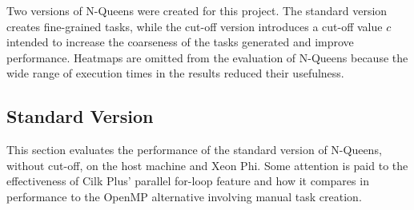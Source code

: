 \documentclass{report}
\begin{document}
Two versions of N-Queens were created for this project. The standard version creates fine-grained tasks, while the cut-off version introduces a cut-off value \(c\) intended to increase the coarseness of the tasks generated and improve performance. Heatmaps are omitted from the evaluation of N-Queens because the wide range of execution times in the results reduced their usefulness.

\subsection{Standard Version} \label{Sec:evalnqueensstandard}

This section evaluates the performance of the standard version of N-Queens, without cut-off, on the host machine and Xeon Phi. Some attention is paid to the effectiveness of Cilk Plus' parallel for-loop feature and how it compares in performance to the OpenMP alternative involving manual task creation.
\end{document}
